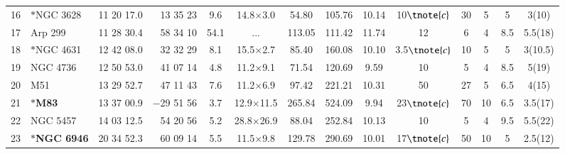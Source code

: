 \documentclass[legal,11pt]{article}
\begin{document}
\begin{table}
\begin{threeparttable}[b]
\begin{tabular}{llrrcccccccccc}
16 & $\ast$NGC 3628 & 11 20 17.0 & 13 35 23 & 9.6 & 14.8$\times$3.0  & 54.80 & 105.76 & 10.14 & 10$\tnote{c}$ & 30 & 5 & 5 & 3(10) \\
17 & Arp 299 & 11 28 30.4 & 58 34 10 & 54.1 & ...  & 113.05 & 111.42 & 11.74 & 12 & 6 & 4 & 8.5 & 5.5(18) \\
18 & $\ast$NGC 4631 & 12 42 08.0 & 32 32 29 & 8.1 & 15.5$\times$2.7  & 85.40 & 160.08 & 10.10 & 3.5$\tnote{c}$ & 10 & 5 & 5 & 3(10.5) \\
19 & NGC 4736 & 12 50 53.0 & 41 07 14 & 4.8 & 11.2$\times$9.1  & 71.54 & 120.69 & 9.59 & 10 & 5 & 4 & 8.5 & 5(19) \\
20 & M51 & 13 29 52.7 & 47 11 43 & 7.6 & 11.2$\times$6.9 & 97.42 & 221.21 & 10.31 & 50 & 27 & 5 & 6.5 & 4(15) \\
21 & $\ast${\bf M83} & 13 37 00.9 & $-$29 51 56 & 3.7 & 12.9$\times$11.5  & 265.84 & 524.09 & 9.94 & 23$\tnote{c}$ & 70 & 10 & 6.5 & 3.5(17) \\
22 & NGC 5457 & 14 03 12.5 & 54 20 56 & 5.2 & 28.8$\times$26.9  & 88.04 & 252.84 & 10.13 & 10 & 5 & 4 & 9.5 & 5.5(22) \\
23 & $\ast${\bf NGC 6946} & 20 34 52.3 & 60 09 14 & 5.5 & 11.5$\times$9.8  & 129.78 & 290.69 & 10.01 & 17$\tnote{c}$ & 50 & 10 & 5 & 2.5(12) \\


 \hline
 \end{tabular}

\begin{tablenotes}


\end{tablenotes}
\end{threeparttable}
\end{table}
\end{document}

